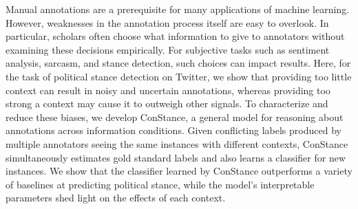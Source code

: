 Manual annotations are a prerequisite for many applications of machine learning. However, weaknesses in the annotation process itself are easy to overlook. In particular, scholars often choose what information to give to annotators without examining these decisions empirically. For subjective tasks such as sentiment analysis, sarcasm, and stance detection, such choices can impact results. Here, for the task of political stance detection on Twitter, we show that providing too little context can result in noisy and uncertain annotations, whereas providing too strong a context may cause it to outweigh other signals. To characterize and reduce these biases, we develop ConStance, a general model for reasoning about annotations across information conditions. Given conflicting labels produced by multiple annotators seeing the same instances with different contexts, ConStance simultaneously estimates gold standard labels and also learns a classifier for new instances. We show that the classifier learned by ConStance outperforms a variety of baselines at predicting political stance, while the model's interpretable parameters shed light on the effects of each context.
